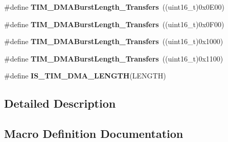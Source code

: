 \begin{DoxyCompactItemize}
\item 
\hypertarget{group___t_i_m___d_m_a___burst___length_gad13373f5fd246557a4fc487dc43c37ec}{}\#define {\bfseries T\+I\+M\+\_\+\+D\+M\+A\+Burst\+Length\+\_\+Transfers}~((uint16\+\_\+t)0x0\+E00)\label{group___t_i_m___d_m_a___burst___length_gad13373f5fd246557a4fc487dc43c37ec}

\item 
\hypertarget{group___t_i_m___d_m_a___burst___length_gafb644e6033f7b46c602b02754b69fde0}{}\#define {\bfseries T\+I\+M\+\_\+\+D\+M\+A\+Burst\+Length\+\_\+Transfers}~((uint16\+\_\+t)0x0\+F00)\label{group___t_i_m___d_m_a___burst___length_gafb644e6033f7b46c602b02754b69fde0}

\item 
\hypertarget{group___t_i_m___d_m_a___burst___length_ga5b2c97f650a3c1726965187d852b8cc5}{}\#define {\bfseries T\+I\+M\+\_\+\+D\+M\+A\+Burst\+Length\+\_\+Transfers}~((uint16\+\_\+t)0x1000)\label{group___t_i_m___d_m_a___burst___length_ga5b2c97f650a3c1726965187d852b8cc5}

\item 
\hypertarget{group___t_i_m___d_m_a___burst___length_gaed9f2afef174079f6eb6927abd995b9b}{}\#define {\bfseries T\+I\+M\+\_\+\+D\+M\+A\+Burst\+Length\+\_\+Transfers}~((uint16\+\_\+t)0x1100)\label{group___t_i_m___d_m_a___burst___length_gaed9f2afef174079f6eb6927abd995b9b}

\item 
\#define {\bfseries I\+S\+\_\+\+T\+I\+M\+\_\+\+D\+M\+A\+\_\+\+L\+E\+N\+G\+T\+H}(L\+E\+N\+G\+T\+H)
\end{DoxyCompactItemize}


\subsection{Detailed Description}


\subsection{Macro Definition Documentation}
\hypertarget{group___t_i_m___d_m_a___burst___length_gafd09cf0887b01a15101ba7dd6e2b4ba7}{}
